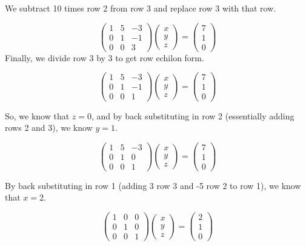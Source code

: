 \documentclass[
]{book}
\theoremstyle{definition}
\theoremstyle{definition}
\theoremstyle{definition}
\theoremstyle{definition}
\theoremstyle{remark}
\begin{document}
We subtract 10 times row 2 from row 3 and replace row 3 with that row.

\[\begin{pmatrix}1 & 5 & -3\\ 0 & 1 & -1\\ 0 & 0 & 3 \end{pmatrix} \begin{pmatrix}x \\ y \\ z \end{pmatrix} = \begin{pmatrix}7 \\ 1 \\ 0 \end{pmatrix}\]
Finally, we divide row 3 by 3 to get row echilon form.

\[\begin{pmatrix}1 & 5 & -3\\ 0 & 1 & -1\\ 0 & 0 & 1 \end{pmatrix} \begin{pmatrix}x \\ y \\ z \end{pmatrix} = \begin{pmatrix}7 \\ 1 \\ 0 \end{pmatrix}\]

So, we know that \(z = 0\), and by back substituting in row 2 (essentially adding rows 2 and 3), we know \(y = 1\).

\[\begin{pmatrix}1 & 5 & -3\\ 0 & 1 & 0\\ 0 & 0 & 1 \end{pmatrix} \begin{pmatrix}x \\ y \\ z \end{pmatrix} = \begin{pmatrix}7 \\ 1 \\ 0 \end{pmatrix}\]

By back substituting in row 1 (adding 3 row 3 and -5 row 2 to row 1), we know that \(x = 2\).

\[\begin{pmatrix}1 & 0 & 0\\ 0 & 1 & 0\\ 0 & 0 & 1 \end{pmatrix} \begin{pmatrix}x \\ y \\ z \end{pmatrix} = \begin{pmatrix}2 \\ 1 \\ 0 \end{pmatrix}\]
\end{document}
